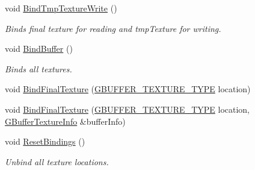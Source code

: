 \begin{DoxyCompactItemize}
\mbox{\label{class_geometry_engine_1_1_geometry_buffer_1_1_g_buffer_af6be0b4fb6077770c9e3a3673b1e5044}} 
void \mbox{\hyperlink{class_geometry_engine_1_1_geometry_buffer_1_1_g_buffer_af6be0b4fb6077770c9e3a3673b1e5044}{Bind\+Tmp\+Texture\+Write}} ()
\begin{DoxyCompactList}\small\item\em Binds final texture for reading and tmp\+Texture for writing. \end{DoxyCompactList}\item 
\mbox{\label{class_geometry_engine_1_1_geometry_buffer_1_1_g_buffer_a9bcec235e3592cec2c51563b3e8984c4}} 
void \mbox{\hyperlink{class_geometry_engine_1_1_geometry_buffer_1_1_g_buffer_a9bcec235e3592cec2c51563b3e8984c4}{Bind\+Buffer}} ()
\begin{DoxyCompactList}\small\item\em Binds all textures. \end{DoxyCompactList}\item 
void \mbox{\hyperlink{class_geometry_engine_1_1_geometry_buffer_1_1_g_buffer_ad64fb7191a7dc256b1282a7f1deab756}{Bind\+Final\+Texture}} (\mbox{\hyperlink{class_geometry_engine_1_1_geometry_buffer_1_1_g_buffer_a718dceafcac1915f7de061108597e1cc}{G\+B\+U\+F\+F\+E\+R\+\_\+\+T\+E\+X\+T\+U\+R\+E\+\_\+\+T\+Y\+PE}} location)
\item 
void \mbox{\hyperlink{class_geometry_engine_1_1_geometry_buffer_1_1_g_buffer_a710627a05fa69f6aa98ee6d90ab57e85}{Bind\+Final\+Texture}} (\mbox{\hyperlink{class_geometry_engine_1_1_geometry_buffer_1_1_g_buffer_a718dceafcac1915f7de061108597e1cc}{G\+B\+U\+F\+F\+E\+R\+\_\+\+T\+E\+X\+T\+U\+R\+E\+\_\+\+T\+Y\+PE}} location, \mbox{\hyperlink{class_geometry_engine_1_1_g_buffer_texture_info}{G\+Buffer\+Texture\+Info}} \&buffer\+Info)
\item 
\mbox{\label{class_geometry_engine_1_1_geometry_buffer_1_1_g_buffer_a1ef28cc887dbd56d20ae4df0617b8eb1}} 
void \mbox{\hyperlink{class_geometry_engine_1_1_geometry_buffer_1_1_g_buffer_a1ef28cc887dbd56d20ae4df0617b8eb1}{Reset\+Bindings}} ()
\begin{DoxyCompactList}\small\item\em Unbind all texture locations. \end{DoxyCompactList}\item 

\end{DoxyCompactItemize}
